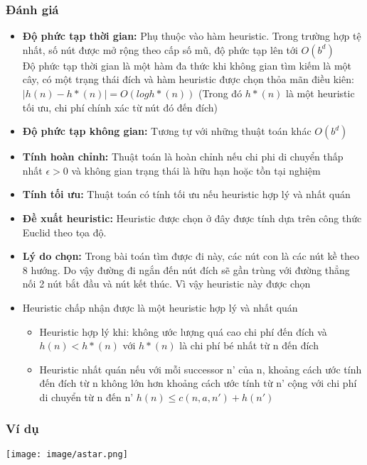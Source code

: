 \documentclass{article}
\begin{document}
\subsubsection{Đánh giá}
\begin{itemize}
    \item \textbf{Độ phức tạp thời gian:} Phụ thuộc vào hàm heuristic. Trong trường hợp tệ nhất, số nút được mở rộng theo cấp số mũ, độ phức tạp lên tới $O(b^d)$ \vspace{2pt}\\
     Độ phức tạp thời gian là một hàm đa thức khi không gian tìm kiếm là một cây, có một trạng thái đích và hàm heuristic được chọn thỏa mãn điều kiên:$| h(n) - h*(n) | = O(log h*(n) )$ (Trong đó $h*(n)$ là một heuristic tối ưu, chi phí chính xác từ nút đó đến đích)
    \item \textbf{Độ phức tạp không gian:} Tương tự với những thuật toán khác $O(b^d)$ 
    \item \textbf{Tính hoàn chỉnh: }Thuật toán là hoàn chỉnh nếu chi phi di chuyển thấp nhất $\epsilon > 0$ và không gian trạng thái là hữu hạn hoặc tồn tại nghiệm
    \item \textbf{Tính tối ưu: }Thuật toán có tính tối ưu nếu heuristic hợp lý và nhất quán
    \item \textbf{Đề xuất heuristic: }Heuristic được chọn ở đây được tính dựa trên công thức Euclid theo tọa độ.
    \item \textbf{Lý do chọn: }Trong bài toán tìm được đi này, các nút con là các nút kề theo 8 hướng. Do vậy đường đi ngắn đến nút đích sẽ gần trùng với đường thẳng nối 2 nút bắt đầu và nút kết thúc. Vì vậy heuristic này được chọn
    \item Heuristic chấp nhận được là một heuristic hợp lý và nhất quán
    \begin{itemize}
        \item Heuristic hợp lý khi: không ước lượng quá cao chi phí đến đích và $h(n) < h*(n)$ với $h*(n)$ là chi phí bé nhất từ n đến đích
        \item Heuristic nhất quán nếu với mỗi successor n' của n, khoảng cách ước tính đến đích từ n không lớn hơn khoảng cách ước tính từ n' cộng với chi phí di chuyển từ n đến n' $h(n) \leq c(n,a,n') + h(n')$
    \end{itemize}
    
    
\end{itemize}

\subsubsection{Ví dụ}
    \centerline{\texttt{[image: image/astar.png]}}
    \vspace{2\baselineskip}
\end{document}
